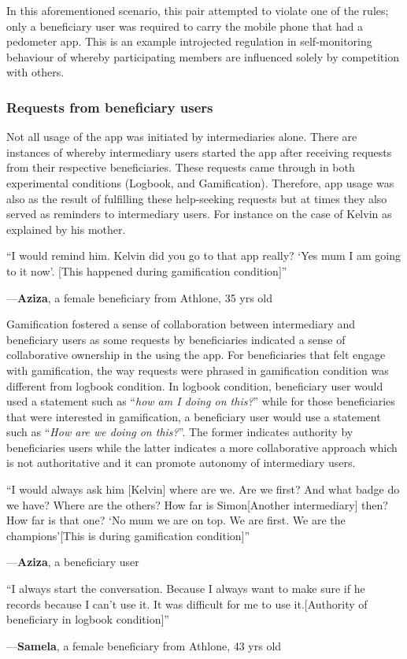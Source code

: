 \documentclass{sig-alternate}
\newenvironment{myquote}
               {\list{}{\rightmargin   \leftmargin
                        \parsep        0in }%
                \item\relax}
               {\endlist}
\newcommand{\userquote}[2]{\begin{samepage}\begin{myquote} 
     \em{\small{#2\begin{flushright}---#1\end{flushright}}}
   \end{myquote}\end{samepage}}
\begin{document}
In this aforementioned scenario, this pair attempted to violate one of the rules; only a beneficiary user was required to carry the mobile phone that had a pedometer app. This is an example introjected regulation in self-monitoring behaviour of whereby participating members are influenced solely by competition with others.
\subsubsection*{\textbf{Requests from beneficiary users}}
Not all usage of the app was initiated by intermediaries alone. There are instances of whereby intermediary users started the app after receiving requests from their respective beneficiaries. These requests came through in both experimental conditions (Logbook, and Gamification). Therefore, app usage was also as the result of fulfilling these help-seeking requests but at times they also served as reminders to intermediary users. For instance on the case of Kelvin as explained by his mother.

\userquote{\textbf{Aziza}, a female beneficiary from Athlone, 35 yrs old} {``I would remind him. Kelvin did you go to that app really? `Yes mum I am going to it now'. [This happened during gamification condition]''} 

Gamification fostered a sense of collaboration between intermediary  and beneficiary users as some requests by beneficiaries indicated a sense of collaborative ownership in the using the app. For beneficiaries that felt engage with gamification, the way requests were phrased in gamification condition was different from logbook condition. In logbook condition, beneficiary user would used a statement such as ``\emph{how am I doing on this?}'' while for those beneficiaries that were interested in gamification, a beneficiary user would use a statement such as ``\emph{How are we doing on this?}''. The former indicates authority by beneficiaries users while the latter indicates a more collaborative approach which is not authoritative and it can promote autonomy of intermediary users.

\userquote{\textbf{Aziza}, a beneficiary user}{``I would always ask him [Kelvin] where are we. Are we first? And what badge do we have? Where are the others? How far is Simon[Another intermediary] then? How far is that one? `No mum we are on top. We are first. We are the champions'[This is during gamification condition]''} 

\userquote{\textbf{Samela}, a female beneficiary from Athlone, 43 yrs old} {``I always start the conversation. Because I always want to make sure if he records because I can't use it. It was difficult for me to use it.[Authority of beneficiary in logbook condition]''}
\end{document}
